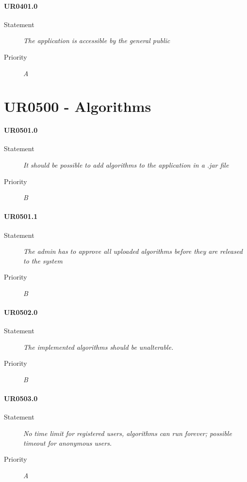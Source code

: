 \paragraph{UR0401.0}
\begin{description}
\item [Statement] \textit{
The application is accessible by the general public
}
\item [Priority] \textit{A}
\end{description}

\section{UR0500 - Algorithms}

\paragraph{UR0501.0}
\begin{description}
\item [Statement] \textit{
It should be possible to add algorithms to the application in a .\gls{jar} file
}
\item [Priority] \textit{B}
\end{description}

\paragraph{UR0501.1}
\begin{description}
\item [Statement] \textit{
The admin has to approve all uploaded algorithms before they are released to the system 
}
\item [Priority] \textit{B}
\end{description}

\paragraph{UR0502.0}
\begin{description}
\item [Statement] \textit{
The implemented algorithms should be unalterable.
}
\item [Priority] \textit{B}
\end{description}

\paragraph{UR0503.0}
\begin{description}
\item [Statement] \textit{
No time limit for registered users, algorithms can run forever; possible timeout for anonymous users.
}
\item [Priority] \textit{A}
\end{description}

